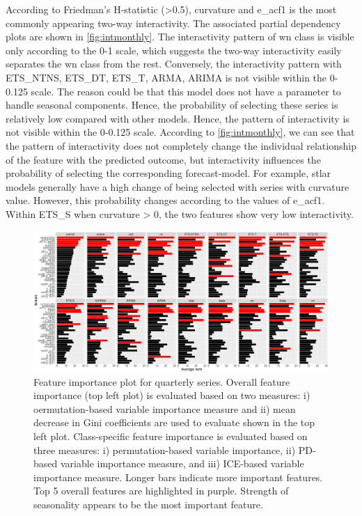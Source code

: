 \documentclass[11pt,a4paper,]{article}
\begin{document}
According to Friedman's H-statistic (\textgreater{}0.5), curvature and e\_acf1 is the most commonly appearing two-way interactivity. The associated partial dependency plots are shown in \autoref{fig:intmonthly}. The interactivity pattern of wn class is visible only according to the 0-1 scale, which suggests the two-way interactivity easily separates the wn class from the rest. Conversely, the interactivity pattern with ETS\_NTNS, ETS\_DT, ETS\_T, ARMA, ARIMA is not visible within the 0-0.125 scale. The reason could be that this model does not have a parameter to handle seasonal components. Hence, the probability of selecting these series is relatively low compared with other models. Hence, the pattern of interactivity is not visible within the 0-0.125 scale. According to \autoref{fig:intmonthly}, we can see that the pattern of interactivity does not completely change the individual relationship of the feature with the predicted outcome, but interactivity influences the probability of selecting the corresponding forecast-model. For example, stlar models generally have a high change of being selected with series with curvature value. However, this probability changes according to the values of e\_acf1. Within ETS\_S when curvature \textgreater{} 0, the two features show very low interactivity.

\begin{figure}
\centering
\includegraphics{figures/viquarterly-1.pdf}
\caption{\label{fig:viquarterly}Feature importance plot for quarterly series. Overall feature importance (top left plot) is evaluated based on two measures: i) oermutation-based variable importance measure and ii) mean decrease in Gini coefficients are used to evaluate shown in the top left plot. Class-specific feature importance is evaluated based on three measures: i) permutation-based variable importance, ii) PD-based variable importance measure, and iii) ICE-based variable importance measure. Longer bars indicate more important features. Top 5 overall features are highlighted in purple. Strength of seasonality appears to be the most important feature.}
\end{figure}
\end{document}
